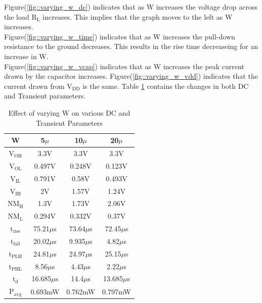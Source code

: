 \documentclass[12pt]{article}
\begin{document}
	Figure(\ref{fig::varying_w_dc}) indicates that as W increases the voltage drop across the load $\text{R}_\text{L}$ increases. This implies that the graph moves to the left as W increases.\\
    Figure(\ref{fig::varying_w_time}) indicates that as W increases the pull-down resistance to the ground decreases. This results in the rise time decreaseing for an increase in W.\\
    Figure(\ref{fig::varying_w_vcap}) indicates that as W increases the peak current drawn by the capacitor increases. Figure(\ref{fig::varying_w_vdd}) indicates that the current drawn from $\text{V}_{\text{DD}}$ is the same. Table \ref{table::tablevaryw} contains the changes in both DC and Transient parameters.
    \begin{table}[H]
    	\begin{center}
    		\begin{tabular}{|c|c|c|c|}
    			\hline 
    			\rule[-1ex]{0pt}{2.5ex} W & 5$\mu$ & 10$\mu$ & 20$\mu$  \\ 
    			\hline 
    			\rule[-1ex]{0pt}{2.5ex} $\text{V}_\text{OH}$ & 3.3V & 3.3V & 3.3V \\ 
    			 $\text{V}_\text{OL}$ & 0.497V & 0.248V & 0.123V \\ 
    			 $\text{V}_\text{IL}$ & 0.791V & 0.58V & 0.493V \\ 
    			 $\text{V}_\text{IH}$ & 2V & 1.57V & 1.24V \\ 
    			 $\text{NM}_\text{H}$ & 1.3V & 1.73V & 2.06V \\ 
    			 $\text{NM}_\text{L}$ & 0.294V & 0.332V & 0.37V \\ 
    			 $\text{t}_\text{rise}$ & 75.21$\mu$s & 73.64$\mu$s & 72.45$\mu$s \\ 
    			 $\text{t}_\text{fall}$ & 20.02$\mu$s & 9.935$\mu$s & 4.82$\mu$s \\ 
    			 $\text{t}_\text{PLH}$ & 24.81$\mu$s & 24.97$\mu$s & 25.15$\mu$s \\ 
    			 $\text{t}_\text{PHL}$ & 8.56$\mu$s & 4.43$\mu$s & 2.22$\mu$s \\ 
    			 $\text{t}_\text{d}$ & 16.685$\mu$s & 14.4$\mu$s & 13.685$\mu$s \\ 
    			 $\text{P}_\text{avg}$ & 0.693mW  & 0.762mW & 0.797mW \\ 
    			\hline 
    		\end{tabular} 
    	\end{center}
    	\caption{Effect of varying W on various DC and Transient Parameters}
    	\label{table::tablevaryw}
    \end{table}
\end{document}
